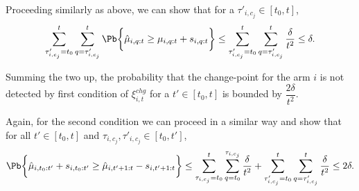 \begin{customproof}{1}


Proceeding similarly as above, we can show that for a $\tau'_{i,c_j}\in[t_0,t]$,
\begin{align*}
\sum_{\tau'_{i,c_j}=t_0}^{t} \sum_{q=\tau'_{i,c_j}}^{t}\Pb\bigg\lbrace \hat{\mu}_{i,q:t} \geq \mu_{i,q:t} + s_{i,q:t}\bigg\rbrace \leq \sum_{\tau'_{i,c_j}=t_0}^{t} \sum_{q=\tau'_{i,c_j}}^{t}\dfrac{\delta}{t^2} \leq \delta.
\end{align*}

Summing the two up, the probability that the change-point for the arm $i$ is not detected by first condition of $\xi^{chg}_{i,t}$ for a $t'\in[t_0,t]$ is bounded by $\dfrac{2\delta}{t^2}$.

Again, for the second condition we can proceed in a similar way and show that for all $t'\in [t_0,t]$ and $\tau_{i,c_j},\tau'_{i,c_j}\in[t_0,t']$,
\begin{align*}
\Pb\bigg\lbrace\hat{\mu}_{i,t_0:t'} +  s_{i,t_0:t'} \geq \hat{\mu}_{i,t'+1:t} - s_{i,t'+1:t}\bigg\rbrace\leq \sum_{\tau_{i,c_j}=t_0}^{t} \sum_{q=t_0}^{\tau_{i,c_j}}\dfrac{\delta}{t^2} +\sum_{\tau'_{i,c_j}=t_0}^{t} \sum_{q=\tau'_{i,c_j}}^{t}\dfrac{\delta}{t^2} \leq 2\delta .
\end{align*} 


\end{customproof}

